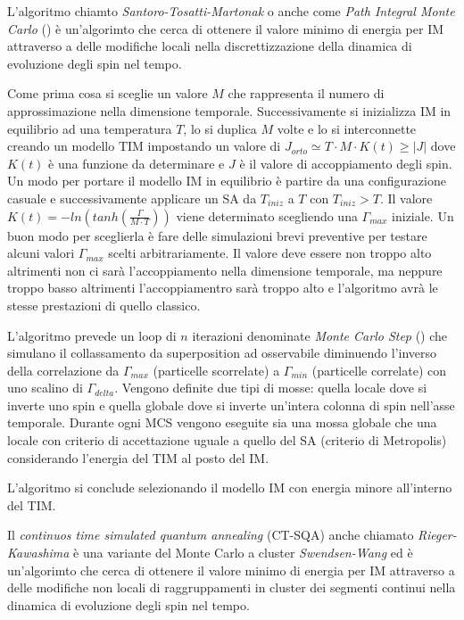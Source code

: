 L'algoritmo chiamto \textit{Santoro-Tosatti-Martonak} o anche come \textit{Path Integral Monte Carlo} ()\cite{PIMC, CODE} è un'algorimto che cerca di ottenere il valore minimo di energia per IM attraverso a delle modifiche locali nella discrettizzazione della dinamica di evoluzione degli spin nel tempo.

Come prima cosa si sceglie un valore $M$ che rappresenta il numero di approssimazione nella dimensione temporale.
Successivamente si inizializza IM in equilibrio ad una temperatura $T$, lo si duplica $M$ volte e lo si interconnette creando un modello TIM impostando un valore di $J_{orto} \simeq T \cdot M \cdot K(t) \ge |J|$ dove $K(t)$ è una funzione da determinare e $J$ è il valore di accoppiamento degli spin. Un modo per portare il modello IM in equilibrio è partire da una configurazione casuale e successivamente applicare un SA da $T_{iniz}$ a $T$ con $T_{iniz} > T$.
Il valore $K(t) = -ln(tanh(\frac{\Gamma}{M \cdot T}))$ viene determinato scegliendo una $\Gamma_{max}$ iniziale. Un buon modo per sceglierla è fare delle simulazioni brevi preventive per testare alcuni valori $\Gamma_{max}$ scelti arbitrariamente. Il valore deve essere non troppo alto altrimenti non ci sarà l'accoppiamento nella dimensione temporale, ma neppure troppo basso altrimenti l'accoppiamentro sarà troppo alto e l'algoritmo avrà le stesse prestazioni di quello classico.

L'algoritmo prevede un loop di $n$ iterazioni denominate \textit{Monte Carlo Step} () che simulano il collassamento da superposition ad osservabile diminuendo l'inverso della correlazione da $\Gamma_{max}$ (particelle scorrelate) a $\Gamma_{min}$ (particelle correlate) con uno scalino di $\Gamma_{delta}$.
Vengono definite due tipi di mosse: quella locale dove si inverte uno spin e quella globale dove si inverte un'intera colonna di spin nell'asse temporale.
Durante ogni MCS vengono eseguite sia una mossa globale che una locale con criterio di accettazione uguale a quello del SA (criterio di Metropolis) considerando l'energia del TIM al posto del IM.

L'algoritmo si conclude selezionando il modello IM con energia minore all'interno del TIM.

Il \textit{continuos time simulated quantum annealing} (CT-SQA)\cite{QVC} anche chiamato \textit{Rieger-Kawashima}\cite{CTSQA, QMCM, CODE} è una variante del Monte Carlo a cluster \textit{Swendsen-Wang}\cite{NCD, QMCM, CODE} ed è un'algorimto che cerca di ottenere il valore minimo di energia per IM attraverso a delle modifiche non locali di raggruppamenti in cluster dei segmenti continui nella dinamica di evoluzione degli spin nel tempo.

